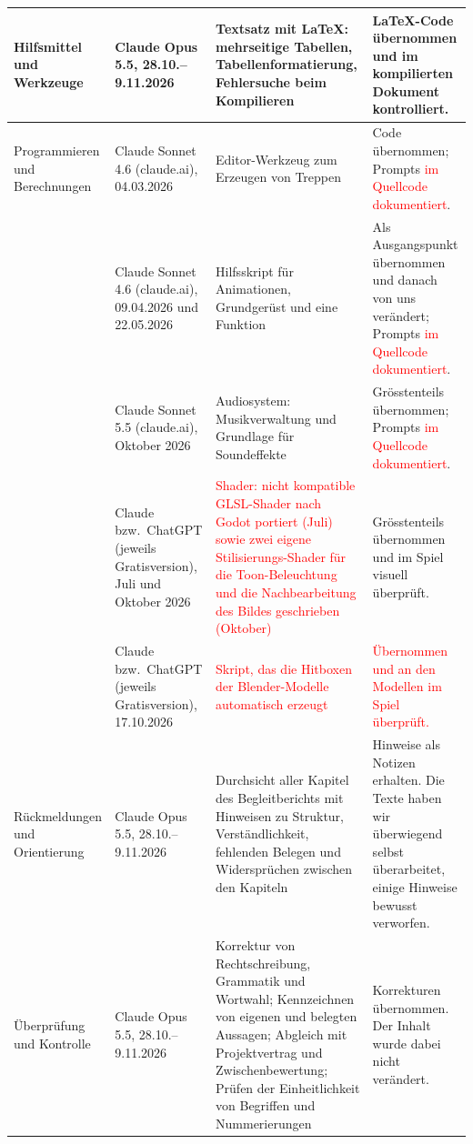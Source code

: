 \documentclass[../Main.tex]{subfiles}
\begin{document}
{\begin{longtable}{|>{\raggedright\arraybackslash}p{2.3cm}|>{\raggedright\arraybackslash}p{2.4cm}|>{\raggedright\arraybackslash}p{4.4cm}|>{\raggedright\arraybackslash}p{4.6cm}|}
        \hline
        Hilfsmittel und Werkzeuge & Claude Opus 5.5, 28.10.--9.11.2026 & Textsatz mit \LaTeX: mehrseitige Tabellen, Tabellenformatierung, Fehlersuche beim Kompilieren & \LaTeX-Code übernommen und im kompilierten Dokument kontrolliert. \\
        \hline
        Programmieren und Berechnungen & Claude Sonnet 4.6 (claude.ai), 04.03.2026 & Editor-Werkzeug zum Erzeugen von Treppen & Code übernommen; Prompts \textcolor{red}{im Quellcode dokumentiert}. \\
        \hline
        & Claude Sonnet 4.6 (claude.ai), 09.04.2026 und 22.05.2026 & Hilfsskript für Animationen, Grundgerüst und eine Funktion & Als Ausgangspunkt übernommen und danach von uns verändert; Prompts \textcolor{red}{im Quellcode dokumentiert}. \\
        \hline
        & Claude Sonnet 5.5 (claude.ai), Oktober 2026 & Audiosystem: Musikverwaltung und Grundlage für Soundeffekte & Grösstenteils übernommen; Prompts \textcolor{red}{im Quellcode dokumentiert}. \\
        \hline
        & Claude bzw.\ ChatGPT (jeweils Gratisversion), Juli und Oktober 2026 & \textcolor{red}{Shader: nicht kompatible GLSL-Shader nach Godot portiert (Juli) sowie zwei eigene Stilisierungs-Shader für die Toon-Beleuchtung und die Nachbearbeitung des Bildes geschrieben (Oktober)} & Grösstenteils übernommen und im Spiel visuell überprüft. \\
        \hline
        & Claude bzw.\ ChatGPT (jeweils Gratisversion), 17.10.2026 & \textcolor{red}{Skript, das die Hitboxen der Blender-Modelle automatisch erzeugt} & \textcolor{red}{Übernommen und an den Modellen im Spiel überprüft.} \\
        \hline
        Rückmeldungen und Orientierung & Claude Opus 5.5, 28.10.--9.11.2026 & Durchsicht aller Kapitel des Begleitberichts mit Hinweisen zu Struktur, Verständlichkeit, fehlenden Belegen und Widersprüchen zwischen den Kapiteln & Hinweise als Notizen erhalten. Die Texte haben wir überwiegend selbst überarbeitet, einige Hinweise bewusst verworfen. \\
        \hline
        Überprüfung und Kontrolle & Claude Opus 5.5, 28.10.--9.11.2026 & Korrektur von Rechtschreibung, Grammatik und Wortwahl; Kennzeichnen von eigenen und belegten Aussagen; Abgleich mit Projektvertrag und Zwischenbewertung; Prüfen der Einheitlichkeit von Begriffen und Nummerierungen & Korrekturen übernommen. Der Inhalt wurde dabei nicht verändert. \\
        \hline

\end{longtable}}
\end{document}

